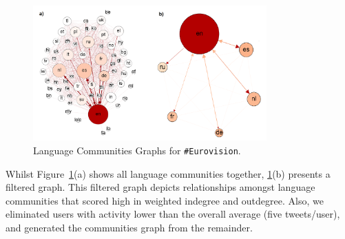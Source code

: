\documentclass{llncs}
\begin{document}
\begin{figure}[htb]
\centering
\includegraphics[width=0.8\textwidth]{images/communitiesgraphs.png}
\caption{Language Communities Graphs for {\texttt{\#Eurovision}}.}
\label{fig:communitiesgraphs}
\end{figure}

Whilst Figure~\ref{fig:communitiesgraphs}(a) shows all language
communities together, \ref{fig:communitiesgraphs}(b) presents a
filtered graph. This filtered graph depicts relationships amongst
language communities that scored high in weighted indegree and
outdegree. Also, we eliminated users with activity lower than the
overall average (five tweets/user), and generated the communities
graph from the remainder.





\end{document}
